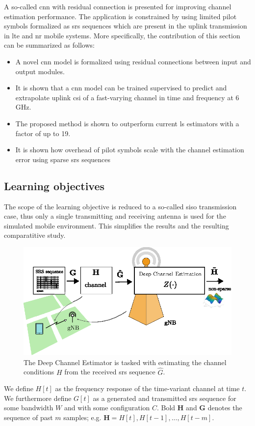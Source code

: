 A so-called \gls{cnn} with residual connection is presented for improving channel estimation performance. The application is constrained by using limited pilot symbols formalized as \gls{srs} sequences which are present in the uplink transmission in \gls{lte} and \gls{nr} mobile systems. More specifically, the contribution of this section can be summarized as follows:
\begin{itemize}
\item A novel \gls{cnn} model is formalized using residual connections between input and output modules.
\item It is shown that a \gls{cnn} model can be trained supervised to predict and extrapolate uplink \gls{csi} of a fast-varying channel in time and frequency at $6$ GHz.
\item The proposed method is shown to outperform current \gls{ls} estimators with a factor of up to 19.
\item It is shown how overhead of pilot symbols scale with the channel estimation error using sparse \gls{srs} sequences
\end{itemize}


\subsection{Learning objectives}
The scope of the learning objective is reduced to a so-called \gls{siso} transmission case, thus only a single transmitting and receiving antenna is used for the simulated mobile environment. This simplifies the results and the resulting comparatitive study.
\begin{figure}
    \centering
    \includegraphics{chapters/part_uplink/figures/channel_estimation_approach_v2.eps}
    \caption{The Deep Channel Estimator is tasked with estimating the channel conditions $H$ from the received \gls{srs} sequence $\hat{G}$.}
    \label{fig:my_label}
\end{figure}
We define $H[t]$ as the frequency response of the time-variant channel at time $t$. We furthermore define $G[t]$ as a generated and transmitted \gls{srs} sequence for some bandwidth $W$ and with some configuration $C$. Bold $\mathbf{H}$ and $\mathbf{G}$ denotes the sequence of past $m$ samples; e.g. $\mathbf{H} = H[t],H[t-1],...,H[t-m]$.

